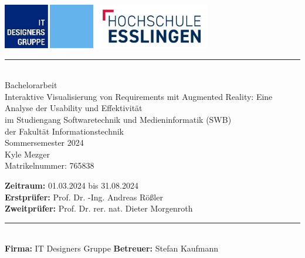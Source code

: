 \newcommand{\HRule}[2]{\noindent\rule[#1]{\linewidth}{#2}} %
\newcommand{\vlinespace}[1]{\vspace*{#1\baselineskip}} %
\newcommand{\titleemph}[1]{\textbf{#1}} %

\begin{titlepage}
 \sffamily %
      \includegraphics[width=4cm]{images/it-d_logo.png}
      \hfill \includegraphics[width=5cm]{images/hslogo_small.png}
      \HRule{13pt}{1pt} 
   \centering
      \Large
      \vlinespace{3}\\
      Bachelorarbeit\\
      \huge
      Interaktive Visualisierung von Requirements mit Augmented Reality: Eine Analyse der Usability und Effektivität\\
%
      \Large
      \vlinespace{2}
          im Studiengang Softwaretechnik und Medieninformatik (SWB)\\
          der Fakultät Informationstechnik\\
%      
      Sommersemester 2024\\
%     
      \vlinespace{2}
      Kyle Mezger\\
      Matrikelnummer: 765838
%
   \vfill
   \raggedright
%   
   \large
  \titleemph{Zeitraum:} 01.03.2024 bis 31.08.2024 \\ %
   \titleemph{Erstprüfer:} Prof. Dr. -Ing. Andreas Rößler \\
   \titleemph{Zweitprüfer:} Prof. Dr. rer. nat. Dieter Morgenroth \\

   \vlinespace{1}
   \HRule{13pt}{1pt} \\
   \titleemph{Firma:} IT Designers Gruppe 
   \hfill \titleemph{Betreuer:} Stefan Kaufmann

\end{titlepage}
